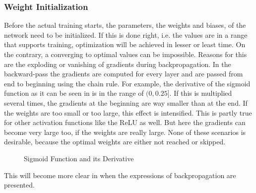 \subsubsection{Weight Initialization}
\label{sec:training-weight-initialization}
Before the actual training starts, the parameters, the weights and biases, of the network need to be initialized.
If this is done right, i.e. the values are in a range that supports training, optimization will be achieved in lesser or least time.
On the contrary, a converging to optimal values can be impossible.
Reasons for this are the exploding or vanishing of gradients during backpropagation\cite{Hochreiter1991}.
In the backward-pass the gradients are computed for every layer and are passed from end to beginning using the chain rule.
For example, the derivative of the sigmoid function as it can be seen in  is in the range of $(0, 0.25]$.
If this is multiplied several times, the gradients at the beginning are way smaller than at the end.
If the weights are too small or too large, this effect is intensified.
This is partly true for other activation functions like the ReLU as well.
But here the gradients can become very large too, if the weights are really large.
None of these scenarios is desirable, because the optimal weights are either not reached or skipped.
\begin{figure}
	\setlength{}
	\setlength{}
	\centering
	
	\caption{Sigmoid Function and its Derivative}
	\label{fig:sigmoid-derivative}
\end{figure}
This will become more clear in  when the expressions of backpropagation are presented.

